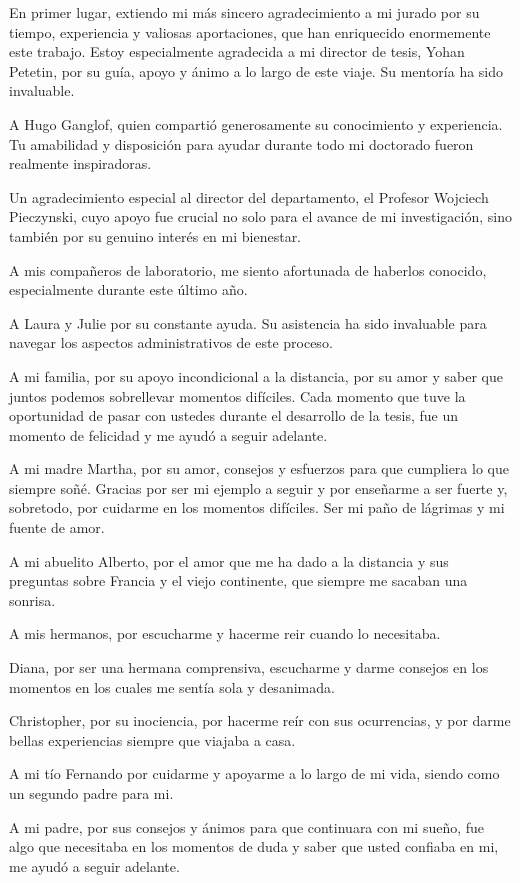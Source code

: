 En primer lugar, extiendo mi más sincero agradecimiento a mi jurado por su
tiempo, experiencia y valiosas aportaciones, que han enriquecido enormemente
este trabajo. Estoy especialmente agradecida a mi director de tesis, Yohan
Petetin, por su guía, apoyo y ánimo a lo largo de este viaje. Su mentoría ha
sido invaluable. 

A Hugo Ganglof, quien compartió generosamente su conocimiento y experiencia. Tu
amabilidad y disposición para ayudar durante todo mi doctorado fueron realmente
inspiradoras. 

Un agradecimiento especial al director del departamento, el
Profesor Wojciech Pieczynski, cuyo apoyo fue crucial no solo para el avance de
mi investigación, sino también por su genuino interés en mi bienestar. 


A mis compañeros de laboratorio, me siento afortunada de haberlos conocido,
especialmente durante este último año. 

A Laura y Julie por su
constante ayuda. Su asistencia ha sido invaluable para navegar los aspectos
administrativos de este proceso.


A mi familia, por su apoyo incondicional a la distancia, por su amor y 
saber que juntos podemos sobrellevar momentos difíciles. 
Cada momento que tuve
la oportunidad de pasar con ustedes durante el desarrollo 
de la tesis, fue un momento de felicidad y me ayudó a seguir adelante.

A mi madre Martha, por su amor, consejos y esfuerzos para que cumpliera lo
que siempre soñé. Gracias por ser mi ejemplo a seguir y por enseñarme
a ser fuerte y, sobretodo, por cuidarme en los momentos difíciles.
Ser mi paño de lágrimas y mi fuente de amor.

A mi abuelito Alberto, por  el amor que 
me ha dado a la distancia y sus preguntas sobre Francia y el viejo continente, 
que siempre me sacaban una sonrisa. 

A mis hermanos, por escucharme y hacerme reir cuando lo necesitaba.

Diana, por ser una hermana comprensiva, escucharme y darme consejos en 
los momentos en los cuales me sentía sola y desanimada.

Christopher, por su inociencia, por hacerme reír con sus ocurrencias, y
por darme bellas experiencias siempre que viajaba a casa.

A mi tío Fernando por cuidarme y apoyarme a lo largo de mi vida, siendo
como un segundo padre para mi.

A mi padre, por sus consejos y ánimos para que continuara con mi sueño, fue algo que
necesitaba en los momentos de duda y saber que usted confiaba en mi, me ayudó a seguir adelante.


